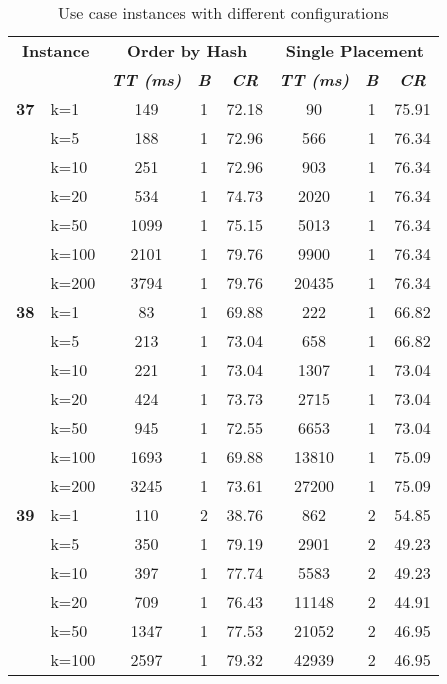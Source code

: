 \begin{table}[htbp]
    \caption{Use case instances with different configurations}
    \begin{tabular}{ll|ccc|ccc}
    
    \multicolumn{ 2}{c|}{\textbf{Instance}} & \multicolumn{ 3}{c|}{\textbf{Order by Hash}} & \multicolumn{ 3}{c}{\textbf{Single Placement}} \\ 
    \multicolumn{ 2}{l|}{} & \textbf{\textit{TT (ms)}} & \textbf{\textit{B}} & \textbf{\textit{CR}} & \textbf{\textit{TT (ms)}} & \textbf{\textit{B}} & \textbf{\textit{CR}} \\ \hline
    \multicolumn{1}{r}{\textbf{37}} & k=1 & 149 & 1 & 72.18 & 90 & 1 & 75.91 \\ 
     & k=5 & 188 & 1 & 72.96 & 566 & 1 & 76.34 \\ 
     & k=10 & 251 & 1 & 72.96 & 903 & 1 & 76.34 \\ 
     & k=20 & 534 & 1 & 74.73 & 2020 & 1 & 76.34 \\ 
     & k=50 & 1099 & 1 & 75.15 & 5013 & 1 & 76.34 \\ 
     & k=100 & 2101 & 1 & 79.76 & 9900 & 1 & 76.34 \\ 
     & k=200 & 3794 & 1 & 79.76 & 20435 & 1 & 76.34 \\ \hline
    \multicolumn{1}{r}{\textbf{38}} & k=1 & 83 & 1 & 69.88 & 222 & 1 & 66.82 \\ 
     & k=5 & 213 & 1 & 73.04 & 658 & 1 & 66.82 \\ 
     & k=10 & 221 & 1 & 73.04 & 1307 & 1 & 73.04 \\ 
     & k=20 & 424 & 1 & 73.73 & 2715 & 1 & 73.04 \\ 
     & k=50 & 945 & 1 & 72.55 & 6653 & 1 & 73.04 \\ 
     & k=100 & 1693 & 1 & 69.88 & 13810 & 1 & 75.09 \\ 
     & k=200 & 3245 & 1 & 73.61 & 27200 & 1 & 75.09 \\ \hline
    \multicolumn{1}{r}{\textbf{39}} & k=1 & 110 & 2 & 38.76 & 862 & 2 & 54.85 \\ 
     & k=5 & 350 & 1 & 79.19 & 2901 & 2 & 49.23 \\ 
     & k=10 & 397 & 1 & 77.74 & 5583 & 2 & 49.23 \\ 
     & k=20 & 709 & 1 & 76.43 & 11148 & 2 & 44.91 \\ 
     & k=50 & 1347 & 1 & 77.53 & 21052 & 2 & 46.95 \\ 
     & k=100 & 2597 & 1 & 79.32 & 42939 & 2 & 46.95 \\ 

\end{tabular}
\end{table}

